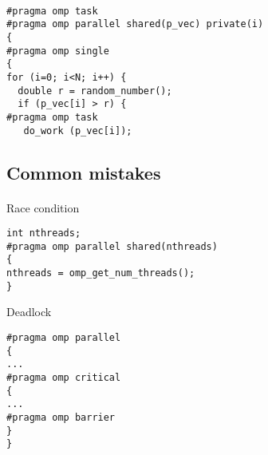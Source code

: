 \documentclass[%
oneside,                 %
final,                   %
10pt]{article}
\begin{document}
\paragraph{}











\begin{verbatim}
#pragma omp task 
#pragma omp parallel shared(p_vec) private(i)
{
#pragma omp single
{
for (i=0; i<N; i++) {
  double r = random_number();
  if (p_vec[i] > r) {
#pragma omp task
   do_work (p_vec[i]);

\end{verbatim}



\subsection*{Common mistakes}

\paragraph{}
Race condition






\begin{verbatim}
int nthreads;
#pragma omp parallel shared(nthreads)
{
nthreads = omp_get_num_threads();
}

\end{verbatim}

Deadlock










\begin{verbatim}
#pragma omp parallel
{
...
#pragma omp critical
{
...
#pragma omp barrier
}
}

\end{verbatim}
\end{document}
